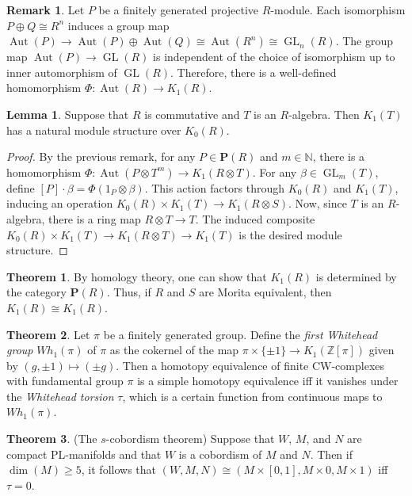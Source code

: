 \documentclass[10pt,letterpaper,cm]{nupset}
\theoremstyle{definition}
\newtheorem{remark}{Remark}
\newtheorem{theorem}{Theorem}
\newtheorem{lemma}{Lemma}
\newcommand{\N}{\mathbb N}
\renewcommand{\P}{\mathbf P}
\newcommand{\Z}{\mathbb Z}
\newcommand{\1}{\mathbf{1}}
\newcommand{\0}{\vec 0}
\DeclareMathOperator*{\GL}{GL}
\DeclareMathOperator{\aut}{Aut}
\begin{document}
\begin{remark}
Let $P$ be a finitely generated projective $R$-module. Each isomorphism $P \oplus Q \cong R^n$ induces a group map $\aut(P) \to \aut(P) \oplus \aut(Q) \cong \aut(R^n) \cong \GL_n(R)$. The group map $\aut(P) \to \GL(R)$ is independent of the choice of isomorphism up to inner automorphism of $\GL(R)$. Therefore, there is a well-defined homomorphism $\Phi: \aut(R) \to K_1(R)$.
\end{remark}

\begin{lemma}
Suppose that $R$ is commutative and $T$ is an $R$-algebra. Then $K_1(T)$ has a natural module structure over $K_0(R)$.
\end{lemma}
\begin{proof}
By the previous remark, for any $P \in \P(R)$ and $m\in \N$, there is a homomorphism $\Phi : \aut(P \otimes T^m) \to K_1(R\otimes T).$ For any $\beta \in \GL_m(T)$, define $[P] \cdot \beta = \Phi(1_P \otimes \beta)$. This action factors through $K_0(R)$ and $K_1(T)$, inducing an operation $K_0(R) \times K_1(T) \to K_1(R \otimes S)$. Now, since $T$ is an $R$-algebra, there is a ring map $R\otimes T \to T$. The induced composite $K_0(R) \times K_1(T) \to K_1(R \otimes T) \to K_1(T)$ is the desired module structure.
\end{proof}

\begin{theorem}
By homology theory, one can show that $K_1(R)$ is determined by the category $\P(R)$. Thus, if $R$ and $S$ are Morita equivalent, then $K_1(R) \cong K_1(R)$. 
\end{theorem}

\begin{theorem}
Let $\pi$ be a finitely generated group. Define the \textit{first Whitehead group} $Wh_1(\pi)$ of $\pi$ as the cokernel of the map $\pi \times \{\pm 1\}\to K_1(\Z[\pi])$ given by $(g, \pm 1)\mapsto (\pm g)$. Then a homotopy equivalence of finite CW-complexes with fundamental group $\pi$ is a simple homotopy equivalence iff it vanishes under the \textit{Whitehead torsion} $\tau$, which is a certain function from continuous maps to $Wh_1(\pi)$.
\end{theorem}

\begin{theorem}{(The $s$-cobordism theorem)}
Suppose that $W$, $M$, and $N$ are compact PL-manifolds and that $W$ is a cobordism of $M$ and $N$. Then if $\dim(M) \geq 5$, it follows that $(W, M, N) \cong (M \times [0, 1], M \times 0, M \times 1)$ iff $\tau= 0$.
\end{theorem}
\end{document}
